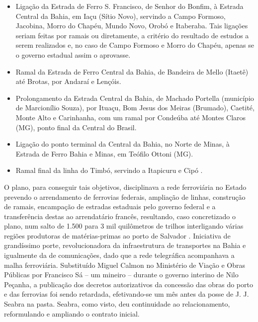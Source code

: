 \begin{itemize}
\item Ligação da Estrada de Ferro S. Francisco, de Senhor do Bonfim, à Estrada Central da Bahia, em Iaçu (Sítio Novo), servindo a Campo Formoso, Jacobina, Morro do Chapéu, Mundo Novo, Orobó e Itaberaba. Tais ligações seriam feitas por ramais ou diretamente, a critério do resultado de estudos a serem realizados e, no caso de Campo Formoso e Morro do Chapéu, apenas se o governo estadual assim o aprovasse.
\item Ramal da Estrada de Ferro Central da Bahia, de Bandeira de Mello (Itaetê) até Brotas, por Andaraí e Lençóis.
\item Prolongamento da Estrada Central da Bahia, de Machado Portella (município de Marcionílio Souza), por Ituaçu, Bom Jesus dos Meiras (Brumado), Caetité, Monte Alto e Carinhanha, com um ramal por Condeúba até Montes Claros (MG), ponto final da Central do Brasil.
\item Ligação do ponto terminal da Central da Bahia, no Norte de Minas, à Estrada de Ferro Bahia e Minas, em Teófilo Ottoni (MG).
\item Ramal final da linha do Timbó, servindo a Itapicuru e Cipó \cite[pp.~215-217]{joaci_porto_2016}.
\end{itemize}

O plano, para conseguir tais objetivos, disciplinava a rede ferroviária no Estado prevendo o arrendamento de ferrovias federais, ampliação de linhas, construção de ramais, encampação de estradas estaduais pelo governo federal e a transferência destas ao arrendatário francês, resultando, caso concretizado o plano, num salto de 1.500 para 3 mil quilômetros de trilhos interligando várias regiões produtoras de matérias-primas ao porto de Salvador \cite[pp.~217]{joaci_porto_2016}. Iniciativa de grandíssimo porte, revolucionadora da infraestrutura de transportes na Bahia e igualmente da de comunicações, dado que a rede telegráfica acompanhava a malha ferroviária. Substituído Miguel Calmon no Ministério de Viação e Obras Públicas por Francisco Sá -- um mineiro --  durante o governo interino de Nilo Peçanha, a publicação dos decretos autorizativos da concessão das obras do porto e das ferrovias foi sendo retardada, efetivando-se um mês antes da posse de J. J. Seabra na pasta. Seabra, como visto, deu continuidade ao relacionamento, reformulando e ampliando o contrato inicial.

